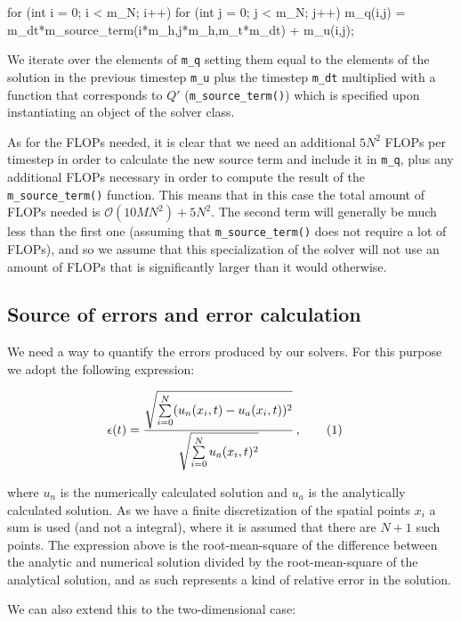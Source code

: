 \documentclass[reprint,english,notitlepage]{revtex4-1}  %
\newcommand\numberthis{\addtocounter{equation}{1}\tag{\theequation}}
\begin{document}
\begin{cpp}
for (int i = 0; i < m_N; i++){
  for (int j = 0; j < m_N; j++){
    m_q(i,j) = m_dt*m_source_term(i*m_h,j*m_h,m_t*m_dt) + m_u(i,j);
  }
}
\end{cpp}

We iterate over the elements of \verb+m_q+ setting them equal to the elements of the solution in the previous timestep \verb+m_u+ plus the timestep \verb+m_dt+ multiplied with a function that corresponds to $Q'$ (\verb+m_source_term()+) which is specified upon instantiating an object of the solver class.

As for the FLOPs needed, it is clear that we need an additional $5N^2$ FLOPs per timestep in order to calculate the new source term and include it in \verb+m_q+, plus any additional FLOPs necessary in order to compute the result of the \verb+m_source_term()+ function. This means that in this case the total amount of FLOPs needed is $\mathcal{O}(10MN^2) + 5N^2$. The second term will generally be much less than the first one (assuming that \verb+m_source_term()+ does not require a lot of FLOPs), and so we assume that this specialization of the solver will not use an amount of FLOPs that is significantly larger than it would otherwise.


\subsection{Source of errors and error calculation} \label{sec:method_errors}

We need a way to quantify the errors produced by our solvers. For this purpose we adopt the following expression:

\begin{align*}
\epsilon (t) &= \frac{\sqrt{\sum\limits_{i=0}^N (u_n(x_i,t) - u_a(x_i,t))^2}}{\sqrt{\sum\limits_{i=0}^N u_a(x_i,t)^2}} \, , \numberthis \label{eq:error_1D}
\end{align*}

where $u_n$ is the numerically calculated solution and $u_a$ is the analytically calculated solution. As we have a finite discretization of the spatial points $x_i$ a sum is used (and not a integral), where it is assumed that there are $N+1$ such points. The expression above is the root-mean-square of the difference between the analytic and numerical solution divided by the root-mean-square of the analytical solution, and as such represents a kind of relative error in the solution. 

We can also extend this to the two-dimensional case:
\end{document}
